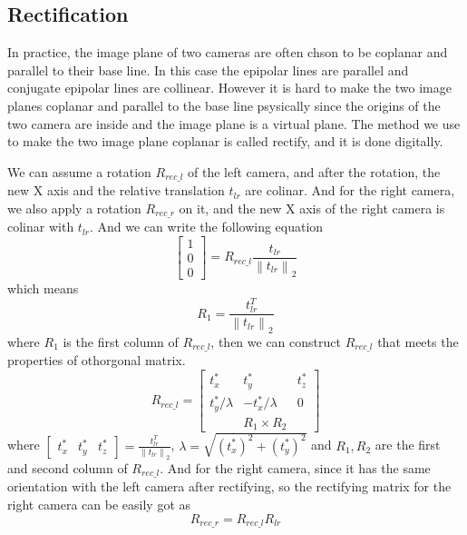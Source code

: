 \documentclass{article}
\begin{document}
\subsection*{Rectification}
\par
In practice, the image plane of two cameras are often chson to be coplanar and parallel to their base line. In this case the epipolar lines are parallel and conjugate epipolar lines are collinear. However it is hard to make the two image planes coplanar and parallel to the base line psysically since the origins of the two camera are inside and the image plane is a virtual plane. The method we use to make the two image plane coplanar is called rectify, and it is done digitally.\cite{ref1} 
\par
We can assume a rotation $R_{rec\_l}$ of the left camera, and after the rotation, the new X axis and the relative translation $t_{lr}$ are colinar. And for the right camera, we also apply a rotation $R_{rec\_r}$ on it, and the new X axis of the right camera is colinar with $t_{lr}$. And we can write the following equation
\begin{equation}
\begin{bmatrix}1\\0\\0\end{bmatrix}=R_{rec\_l}\frac{t_{lr}}{\left\|t_{lr}\right\|_2}
\end{equation}
which means
\begin{equation}
R_1 = \frac{t_{lr}^T}{\left\|t_{lr}\right\|_2}
\end{equation}
where $R_1$ is the first column of $R_{rec\_l}$, then we can construct $R_{rec\_l}$ that meets the properties of othorgonal matrix.
\begin{equation}
R_{rec\_l}=\begin{bmatrix}
t_x^*&t_y^*&t_z^*\\
t_y^*/\lambda&-t_x^*/\lambda&0\\
 &R_1\times R_2& 
\end{bmatrix}
\end{equation}
where $\begin{bmatrix}t_x^*&t_y^*&t_z^*\end{bmatrix}=\frac{t_{lr}^T}{\left\|t_{lr}\right\|_2}$, $\lambda = \sqrt{(t_x^*)^2+(t_y^*)^2}$ and $R_1,R_2$ are the first and second column of $R_{rec\_l}$. And for the right camera, since it has the same orientation with the left camera after rectifying, so the rectifying matrix for the right camera can be easily got as 
\begin{equation}
R_{rec\_r}=R_{rec\_l}R_{lr}
\end{equation}
\end{document}
